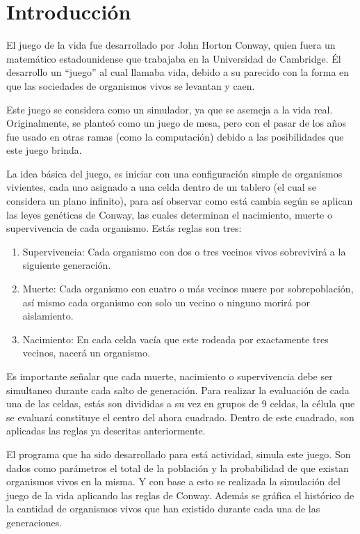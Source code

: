 \section{Introducción}
	El juego de la vida fue desarrollado por John Horton Conway, quien fuera un matemático estadounidense que trabajaba en la Universidad de Cambridge. Él desarrollo un ``juego'' al cual llamaba vida, debido a su parecido con la forma en que las sociedades de organismos vivos se levantan y caen.\cite{web}

	Este juego se considera como un simulador, ya que se asemeja a la vida real. Originalmente, se planteó como un juego de mesa, pero con el pasar de los años fue usado en otras ramas (como la computación) debido a las posibilidades que este juego brinda.

	La idea básica del juego, es iniciar con una configuración simple de organismos vivientes, cada uno asignado a una celda dentro de un tablero (el cual se considera un plano infinito), para así observar como está cambia según se aplican las leyes genéticas de Conway, las cuales determinan el nacimiento, muerte o supervivencia de cada organismo. Estás reglas son tres:
	\begin{enumerate}
		\item Supervivencia: Cada organismo con dos o tres vecinos vivos sobrevivirá a la siguiente generación.
		\item Muerte: Cada organismo con cuatro o más vecinos muere por sobrepoblación, así mismo cada organismo con solo un vecino o ninguno morirá por aislamiento.
		\item Nacimiento: En cada celda vacía que este rodeada por exactamente tres vecinos, nacerá un organismo. \cite{web}
	\end{enumerate}

	Es importante señalar que cada muerte, nacimiento o supervivencia debe ser simultaneo durante cada salto de generación.
	Para realizar la evaluación de cada una de las celdas, estás son divididas a su vez en grupos de 9 celdas, la célula que se evaluará constituye el centro del ahora cuadrado. Dentro de este cuadrado, son aplicadas las reglas ya descritas anteriormente.

	El programa que ha sido desarrollado para está actividad, simula este juego. Son dados como parámetros el total de la población y la probabilidad de que existan organismos vivos en la misma. Y con base a esto se realizada la simulación del juego de la vida aplicando las reglas de Conway. Además se gráfica el histórico de la cantidad de organismos vivos que han existido durante cada una de las generaciones.